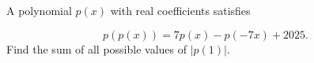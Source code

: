 A polynomial $p(x)$ with real coefficients satisfies

$$p(p(x))=7p(x)-p(-7x)+2025.$$Find the sum of all possible values of $|p(1)|.$
